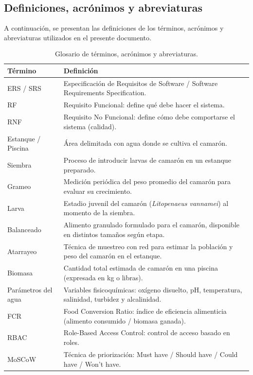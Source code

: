 \documentclass[11pt,a4paper]{article}
\begin{document}
\subsection{Definiciones, acrónimos y abreviaturas}

A continuación, se presentan las definiciones de los términos, acrónimos y abreviaturas utilizados en el presente documento.
\begin{longtable}{|p{4cm}|p{11cm}|}
\caption{Glosario de términos, acrónimos y abreviaturas.}
\label{tab:glosario} \\
\hline
\textbf{Término} & \textbf{Definición} \\
\hline
ERS / SRS & Especificación de Requisitos de Software / Software Requirements Specification. \\
\hline
RF & Requisito Funcional: define qué debe hacer el sistema. \\
\hline
RNF & Requisito No Funcional: define cómo debe comportarse el sistema (calidad). \\
\hline
Estanque / Piscina & Área delimitada con agua donde se cultiva el camarón. \\
\hline
Siembra & Proceso de introducir larvas de camarón en un estanque preparado. \\
\hline
Grameo & Medición periódica del peso promedio del camarón para evaluar su crecimiento. \\
\hline
Larva & Estadio juvenil del camarón (\textit{Litopenaeus vannamei}) al momento de la siembra. \\
\hline
Balanceado & Alimento granulado formulado para el camarón, disponible en distintos tamaños según etapa. \\
\hline
Atarrayeo & Técnica de muestreo con red para estimar la población y peso del camarón en el estanque. \\
\hline
Biomasa & Cantidad total estimada de camarón en una piscina (expresada en kg o libras). \\
\hline
Parámetros del agua & Variables fisicoquímicas: oxígeno disuelto, pH, temperatura, salinidad, turbidez y alcalinidad. \\
\hline
FCR & Food Conversion Ratio: índice de eficiencia alimenticia (alimento consumido / biomasa ganada). \\
\hline
RBAC & Role-Based Access Control: control de acceso basado en roles. \\
\hline
MoSCoW & Técnica de priorización: Must have / Should have / Could have / Won't have. \\
\hline

\end{longtable}
\end{document}
